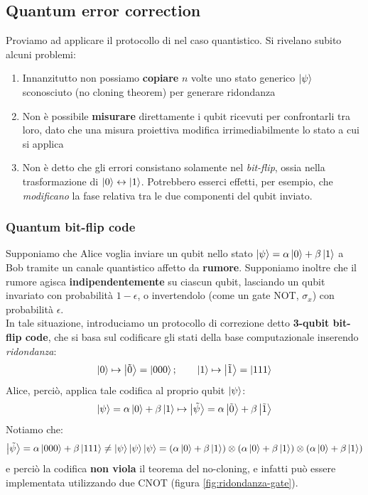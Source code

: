 \documentclass[../../InformazioneQuantistica.tex]{subfiles}
\begin{document}
\subsection{Quantum error correction}
Proviamo ad applicare il protocollo di  nel caso quantistico. Si rivelano subito alcuni problemi:
\begin{enumerate}
\item Innanzitutto non possiamo \textbf{copiare} $n$ volte uno stato generico $\Ket{\psi}$ sconosciuto (no cloning theorem) per generare ridondanza
\item Non è possibile \textbf{misurare} direttamente i qubit ricevuti per confrontarli tra loro, dato che una misura proiettiva modifica irrimediabilmente lo stato a cui si applica
\item Non è detto che gli errori consistano solamente nel \textit{bit-flip}, ossia nella trasformazione di $\Ket{0}\leftrightarrow \Ket{1}$. Potrebbero esserci effetti, per esempio, che \textit{modificano} la fase relativa tra le due componenti del qubit inviato.
\end{enumerate}

\subsubsection{Quantum bit-flip code}
Supponiamo che Alice voglia inviare un qubit nello stato $\Ket{\psi} = \alpha \Ket{0} + \beta\Ket{1}$ a Bob tramite un canale quantistico affetto da \textbf{rumore}. Supponiamo inoltre che il rumore agisca \textbf{indipendentemente} su ciascun qubit, lasciando un qubit invariato con probabilità $1-\epsilon$, o invertendolo (come un gate NOT, $\sigma_x$) con probabilità $\epsilon$.\\
In tale situazione, introduciamo un protocollo di correzione detto \textbf{3-qubit bit-flip code}, che si basa sul codificare gli stati della base computazionale inserendo \textit{ridondanza}:
\begin{align*}
    \Ket{0}\mapsto \Ket{\tilde{0}} = \Ket{000}; \qquad \Ket{1}\mapsto \Ket{\tilde{1}} = \Ket{111}
\end{align*}
Alice, perciò, applica tale codifica al proprio qubit $\Ket{\psi}$:
\begin{align*}
    \Ket{\psi} = \alpha\Ket{0} + \beta \Ket{1} \mapsto \Ket{\tilde{\psi}} = \alpha \Ket{\tilde{0}} + \beta \Ket{\tilde{1}}
\end{align*}
Notiamo che:
\begin{align*}
    \Ket{\tilde{\psi}} = \alpha\Ket{000} + \beta\Ket{111} \neq \Ket{\psi}\Ket{\psi}\Ket{\psi} = (\alpha\Ket{0} + \beta\Ket{1})\otimes (\alpha\Ket{0} + \beta\Ket{1})\otimes (\alpha \Ket{0} + \beta\Ket{1})
\end{align*}
e perciò la codifica \textbf{non viola} il teorema del no-cloning, e infatti può essere implementata utilizzando due CNOT (figura \ref{fig:ridondanza-gate}).
\end{document}
